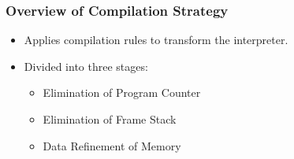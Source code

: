 \documentclass{beamer}
\begin{document}





\begin{frame}
  \frametitle{Overview of Compilation Strategy}
  \begin{itemize}
  \item Applies compilation rules to transform the interpreter.
  \item Divided into three stages:
    \begin{itemize}
    \item Elimination of Program Counter
    \item Elimination of Frame Stack
    \item Data Refinement of Memory
    \end{itemize}
  \end{itemize}
\end{frame}
\end{document}
